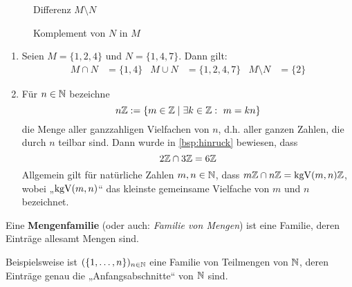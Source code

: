 \begin{defin}
\begin{figure}[ht]
\begin{minipage}{.48\textwidth}
\begin{tikzpicture}[scale=.75]
            \end{tikzpicture}
            \caption{Differenz $M\setminus N$}
        \end{minipage}
        \quad
        \begin{minipage}{.48\textwidth}
            \centering
            \caption{Komplement von $N$ in $M$}
        \end{minipage}
    \end{figure}
\end{defin}


\begin{bsp} \quad
    \begin{enumerate}
        \item Seien $ M = \{1, 2, 4\}$ und $N = \{1, 4, 7\}$. Dann gilt: 
	\begin{align*}
            M \cap N &= \{1, 4\} & M \cup N &= \{1, 2, 4, 7\} & M \setminus N &= \{2\}
	\end{align*}
        \item Für $n\in \N$ bezeichne
            \[ n\Z := \{ m\in \Z \mid \exists k\in \Z:\ m=kn \} \]
        die Menge aller ganzzahligen Vielfachen von $n$, d.h. aller ganzen Zahlen, die durch $n$ teilbar sind. Dann wurde in \cref{bsp:hinruck} bewiesen, dass
            \[ 2\Z \cap 3\Z = 6\Z \]
        Allgemein gilt für natürliche Zahlen $m,n\in \N$, dass $m\Z\cap n\Z = \kgV(m,n)\Z$, wobei „$\kgV(m,n)$“ das kleinste gemeinsame Vielfache von $m$ und $n$ bezeichnet.
    \end{enumerate}
\end{bsp}


\begin{defin}[Mengenfamilie] 
    Eine \textbf{Mengenfamilie} (oder auch: \emph{Familie von Mengen}) ist eine Familie, deren Einträge allesamt Mengen sind.
\end{defin}


\begin{bsp}
    Beispielsweise ist $(\{1,\dots , n\})_{n\in \N}$ eine Familie von Teilmengen von $\N$, deren Einträge genau die „Anfangsabschnitte“ von $\N$ sind.
\end{bsp}


